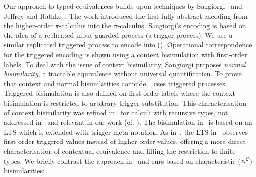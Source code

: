 Our approach %
to typed equivalences
builds upon techniques by Sangiorgi~\cite{SangiorgiD:expmpa,San96H}
and Jeffrey and Rathke~\cite{JeffreyR05}.
The work %
\cite{SangiorgiD:expmpa}
introduced the first fully-abstract encoding from the higher-order 
$\pi$-calculus into the $\pi$-calculus. 
Sangiorgi's encoding is based on the idea of a replicated input-guarded process 
(a trigger process). We use a similar 
replicated triggered process 
to encode \HOp into \sessp ().
 Operational correspondence for
the triggered encoding is shown using a context bisimulation
with first-order labels.
To deal with the issue of context bisimilarity, 
Sangiorgi proposes \emph{normal bisimilarity}, 
a tractable  equivalence without universal quantification. 
To prove that context and normal bisimilarities coincide,~\cite{SangiorgiD:expmpa} uses 
triggered processes.
Triggered bisimulation is also defined on first-order labels
where the context bisimulation is restricted to arbitrary
trigger substitution. %
This
characterisation of context bisimilarity  was refined in~\cite{JeffreyR05} for
calculi with recursive types, not addressed in~\cite{San96H,SangiorgiD:expmpa} and
relevant in our work (cf. ).
The
bisimulation in~\cite{JeffreyR05}
is based on an LTS which is extended with trigger meta-notation.
As in~\cite{San96H,SangiorgiD:expmpa}, 
the LTS in~\cite{JeffreyR05}
observes first-order triggered values instead of
higher-order values, offering a more direct characterisation of contextual equivalence
and lifting the restriction to finite types.
We briefly contrast 
the approach in~\cite{JeffreyR05} and ours based on 
 characteristic ($\approx^C$) bisimilarities:
